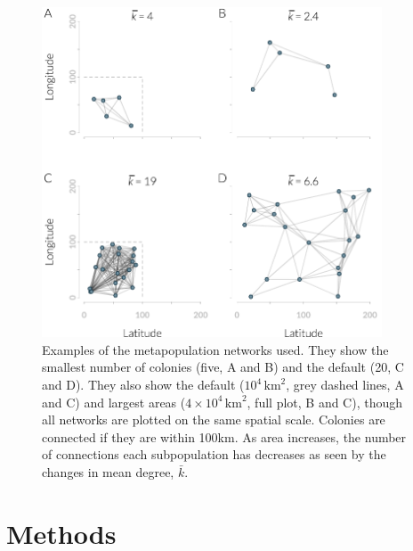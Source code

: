 \begin{knitrout}\footnotesize
{}\color{fgcolor}\begin{figure}[t]

{\centering \includegraphics[width=0.9\textwidth]{figure/colonyNetworkPlots-1} 

}

\caption[Example metapopulation networks]{
Examples of the metapopulation networks used.
They show the smallest number of colonies (five, A and B) and the default (20, C and D).
They also show the default ($10^4\,\text{km}^2$, grey dashed lines, A and C) and largest areas ($4\times10^4\,\text{km}^2$, full plot, B and C), though all networks are plotted on the same spatial scale.
Colonies are connected if they are within 100km.
As area increases, the number of connections each subpopulation has decreases as seen by the changes in mean degree, $\bar{k}$.
}\label{fig:colonyNetworkPlots}
\end{figure}


\end{knitrout}






\section{Methods}

